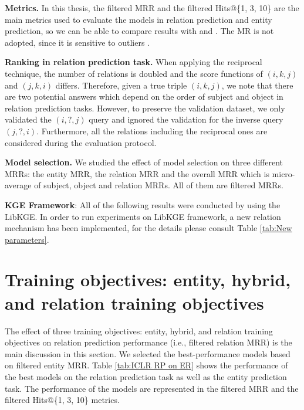 \noindent\textbf{Metrics.} 
In this thesis, the filtered MRR and the filtered Hits@\{1, 3, 10\} are the main metrics used to evaluate the models in relation prediction and entity prediction, so we can be able to compare results with \citet{chen2021relation} and \citet{Ruffinelli2020You}. The MR is not adopted, since it is sensitive to outliers \citep{nickel2016holographic}.
\newline

\noindent\textbf{Ranking in relation prediction task.} When applying the reciprocal technique, the number of relations is doubled and the score functions of $(i, k, j)$ and $(j, k, i)$ differs. Therefore, given a true triple $(i, k, j)$, we note that there are two potential answers which depend on the order of subject and object in relation prediction tasks. However, to preserve the validation dataset, we only validated the $(i, ?, j)$ query and ignored the validation for the inverse query $(j, ?, i)$. Furthermore, all the relations including the reciprocal ones are considered during the evaluation protocol. 
\newline

\noindent\textbf{Model selection.} We studied the effect of model selection on three different MRRs: the entity MRR, the relation MRR and the overall MRR which is micro-average of subject, object and relation MRRs. All of them are filtered MRRs. 
\newline

\noindent\textbf{KGE Framework}: All of the following results were conducted by using the LibKGE. In order to run experiments on LibKGE framework, a new relation mechanism has been implemented, for the details please consult Table \ref{tab:New parameters}.
\newline


\section[Training objectives]{Training objectives: entity, hybrid, and relation training objectives}
\label{sec:Training objectives}

The effect of three training objectives: entity, hybrid, and relation training objectives on relation prediction performance (i.e., filtered relation MRR) is the main discussion in this section. We selected the best-performance models based on filtered entity MRR. Table \ref{tab:ICLR RP on ER} shows the performance of the best models on the relation prediction task as well as the entity prediction task. The performance of the models are represented in the filtered MRR and the filtered Hits@\{1, 3, 10\} metrics. 


